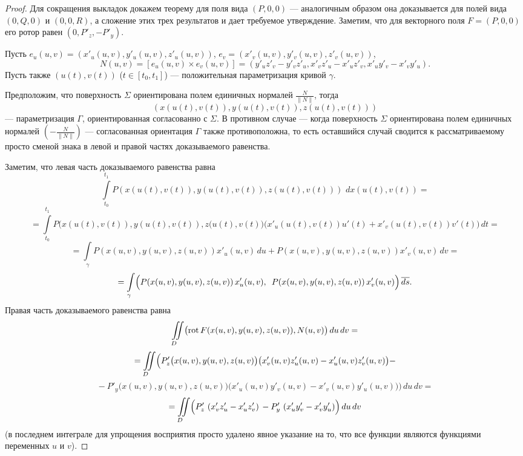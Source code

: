\begin{proof}
Для сокращения выкладок докажем теорему для поля вида
$(P,0,0)$ --- аналогичным образом она доказывается для полей вида $(0,Q,0)$ и
$(0,0,R)$, а сложение этих трех результатов и дает требуемое утверждение.
Заметим, что для векторного поля $F=(P,0,0)$ его ротор равен $(0, P'_z, -P'_y)$.

Пусть $e_u (u,v) = (x'_u (u,v), y'_u (u,v), z'_u (u,v))$,
$e_v = (x'_v (u,v), y'_v (u,v), z'_v (u,v))$,
$$
N(u,v) = [e_u(u,v) \times e_v (u,v)] =
(y'_u z'_v - y'_v z'_u, x'_v z'_u - x'_u z'_v, x'_u y'_v- x'_v y'_u).
$$
Пусть также $(u(t), v(t))$ ($t\in[t_0, t_1]$) --- положительная параметризация кривой $\gamma$.

Предположим, что поверхность $\Sigma$ ориентирована полем единичных нормалей $\frac{N}{\|N\|}$,
тогда
$$
(x(u(t),v(t)), y(u(t),v(t)), z(u(t),v(t)))
$$
--- параметризация $\Gamma$,
ориентированная согласованно с $\Sigma$. В противном случае --- когда поверхность
$\Sigma$ ориентирована полем единичных нормалей $\left(-\frac{N}{\|N\|}\right)$ --- согласованная
ориентация $\Gamma$ также противоположна, то есть оставшийся
случай сводится к рассматриваемому просто сменой знака в левой и правой частях
доказываемого равенства.

Заметим, что левая часть доказываемого равенства равна
$$
\int\limits_{t_0}^{t_1} P(x(u(t),v(t)), y(u(t),v(t)), z(u(t),v(t)))\,\, d x(u(t),v(t)) =
$$
$$
= \int\limits_{t_0}^{t_1} P\bigl(x(u(t),v(t)), y(u(t),v(t)), z(u(t),v(t)\bigr)
\bigl(x'_u (u(t),v(t)) u'(t) + x'_v (u(t),v(t)) v'(t)\bigr)\,dt =
$$
$$
= \int\limits_{\gamma} P(x(u,v), y(u,v), z(u,v)) x'_u (u,v)\,du + 
P(x(u,v), y(u,v), z(u,v)) x'_v (u,v)\,dv = 
$$
$$
= \int\limits_{\gamma} \Bigl(P(x(u,v), y(u,v), z(u,v)) \,x'_u(u,v), \,\,\,P(x(u,v), y(u,v), z(u,v)) \,x'_v (u,v)\Bigr)
\,\overline{ds}.
$$
Правая часть доказываемого равенства равна
$$
\int\limits_{D}\!\!\!\!\int \bigl({\rm rot}\, F (x(u,v), y(u,v), z(u,v)) , N(u,v) \bigr)\, du\,dv =
$$
$$
= \int\limits_{D}\!\!\!\!\int \Bigl(P'_z \bigl(x(u,v), y(u,v), z(u,v)\bigr) \bigl(x'_v (u,v) z'_u (u,v) - x'_u (u,v) z'_v (u,v) \bigr) -
$$
$$
{} - P'_y \bigl(x(u,v), y(u,v), z(u,v)\bigr) \bigl(x'_u (u,v) y'_v (u,v) - x'_v(u,v) y'_u (u,v) \bigr) \Bigr)\,du\,dv =
$$
$$
= \int\limits_{D}\!\!\!\!\int
\Bigl(P'_z \,\,(x'_v z'_u - x'_u z'_v ) \, - P'_y \,\,(x'_u y'_v  - x'_v y'_u)\Bigr) \,du\,dv
$$
(в последнем интеграле для упрощения восприятия просто удалено явное указание на то, что все функции
являются функциями переменных $u$ и $v$).


\end{proof}
